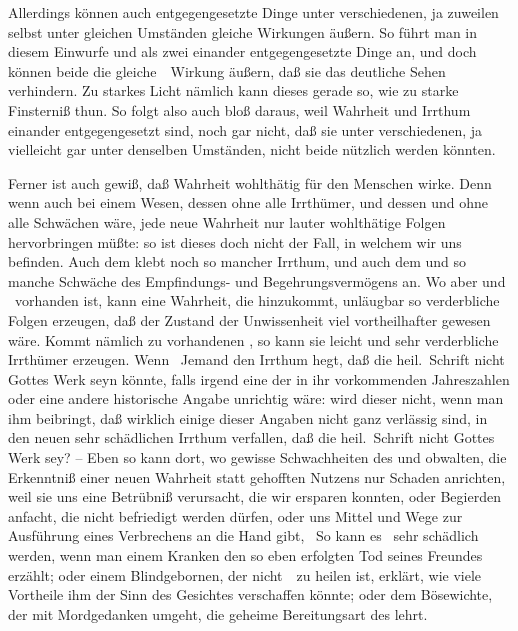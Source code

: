 \begin{aufza} \item Allerdings können auch entgegengesetzte Dinge unter verschiedenen, ja zuweilen selbst unter gleichen Umständen gleiche Wirkungen äußern. So führt man in diesem Einwurfe  und  als zwei einander entgegengesetzte Dinge an, und doch können beide die gleiche~\ Wirkung äußern, daß sie das deutliche Sehen verhindern. Zu starkes Licht nämlich kann dieses gerade so, wie zu starke Finsterniß thun. So folgt also auch bloß daraus, weil Wahrheit und Irrthum einander entgegengesetzt sind, noch gar nicht, daß sie unter verschiedenen, ja vielleicht gar unter denselben Umständen, nicht beide nützlich werden könnten.
\item Ferner ist auch gewiß, daß  Wahrheit wohlthätig für den Menschen wirke. Denn wenn auch bei einem Wesen, dessen  ohne alle Irrthümer, und dessen  und  ohne alle Schwächen wäre, jede neue Wahrheit nur lauter wohlthätige Folgen hervorbringen müßte: so ist dieses doch nicht der Fall, in welchem wir  uns befinden. Auch dem  klebt noch so mancher Irrthum, und auch dem  und  so manche Schwäche des Empfindungs- und Begehrungsvermögens an. Wo aber  und \ vorhanden ist, kann eine Wahrheit, die hinzukommt, unläugbar so verderbliche Folgen erzeugen, daß der Zustand der Unwissenheit viel vortheilhafter gewesen wäre. Kommt nämlich  zu vorhandenen , so kann sie leicht  und sehr verderbliche Irrthümer erzeugen. Wenn \zB\ Jemand den Irrthum hegt, daß die heil.\ Schrift nicht Gottes Werk seyn könnte, falls irgend eine der in ihr vorkommenden Jahreszahlen oder eine andere historische Angabe unrichtig wäre: wird dieser nicht, wenn man ihm beibringt, daß wirklich einige dieser Angaben nicht ganz verlässig sind, in den neuen sehr schädlichen Irrthum verfallen, daß die heil.\ Schrift nicht Gottes Werk sey? -- Eben so kann dort, wo gewisse Schwachheiten des  und  obwalten, die Erkenntniß einer neuen Wahrheit statt gehofften Nutzens nur Schaden anrichten, weil sie uns eine Betrübniß verursacht, die wir ersparen konnten, oder Begierden anfacht, die nicht befriedigt werden dürfen, oder uns Mittel und Wege zur Ausführung eines Verbrechens an die Hand gibt, \udgl\ So kann es \zB\ sehr schädlich werden, wenn man einem Kranken den so eben erfolgten Tod seines Freundes erzählt; oder einem Blindgebornen, der nicht~\ zu heilen ist, erklärt, wie viele Vortheile ihm der Sinn des Gesichtes verschaffen könnte; oder dem Bösewichte, der mit Mordgedanken umgeht, die geheime Bereitungsart des  lehrt.

\end{aufza}
